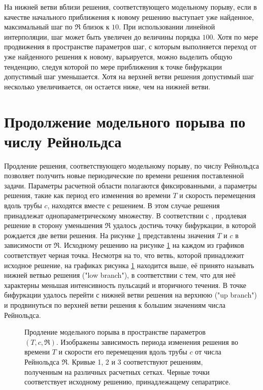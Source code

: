 На нижней ветви вблизи решения, соответствующего модельному порыву, если в качестве начального приближения к новому решению выступает уже найденное, максимальный шаг по $\Re$ близок к $10$. При использовании линейной интерполяции, шаг может быть увеличен до величины порядка $100$. Хотя по мере продвижения в пространстве параметров шаг, с которым выполняется переход от уже найденного решения к новому, варьируется, можно выделить общую тенденцию, следуя которой по мере приближения к точке бифуркации допустимый шаг уменьшается. Хотя на верхней ветви решения допустимый шаг несколько увеличивается, он остается ниже, чем на нижней ветви. 
 

\section{Продолжение модельного порыва по числу Рейнольдса}

Продление решения, соответствующего модельному порыву, по числу Рейнольдса позволяет получить новые периодические по времени решения поставленной задачи. Параметры расчетной области полагаются фиксированными, а параметры решения, такие как период его изменения во времени $T$ и скорость перемещения вдоль трубы $c$, находятся вместе с решением. В этом случае решения принадлежат однопараметрическому множеству. В соответствии с \cite{Avila2013}, продлевая решение в сторону уменьшения $\Re$ удалось достичь точку бифуркации, в которой рождается две ветви решения. На рисунке \ref{local_contin_pic} представлены значения $T$ и $c$ в зависимости от $\Re$. Исходному решению на рисунке \ref{local_contin_pic} на каждом из графиков соответствует черная точка. Несмотря на то, что ветвь, которой принадлежит исходное решение, на графиках рисунка \ref{local_contin_pic} находится выше, её принято называть нижней ветвью решения ("low branch"), в соответствии с тем, что для неё характерны меньшая интенсивность пульсаций и вторичного течения. В точке бифуркации удалось перейти с нижней ветви решения на верхнюю ("up branch") и продвинуться по верхней ветви решения к большим значениям числа Рейнольдса. 


\begin{figure}
\caption{Продление модельного порыва в пространстве параметров $(T, c, \Re)$. Изображены зависимость периода изменения решения во времени $T$ и скорости его перемещения вдоль трубы $c$ от числа Рейнольдса $\Re$. Кривые 1, 2 и 3 соответствуют решениям, полученным на различных расчетных сетках. Черные точки соответствует исходному решению, принадлежащему сепаратрисе.}
\label{local_contin_pic}
\end{figure}

